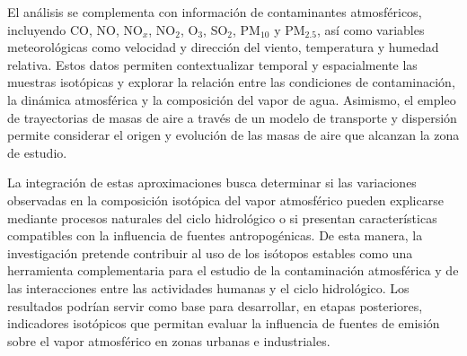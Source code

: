 \documentclass[12pt,a4paper]{article}
\begin{document}
El análisis se complementa con información de contaminantes atmosféricos, 
incluyendo CO, NO, NO$_x$, NO$_2$, O$_3$, SO$_2$, PM$_{10}$ y PM$_{2.5}$, 
así como variables meteorológicas como velocidad y dirección del viento, 
temperatura y humedad relativa. 
Estos datos permiten contextualizar temporal y espacialmente las muestras 
isotópicas y explorar la relación entre las condiciones de contaminación, la 
dinámica atmosférica y la composición del vapor de agua. Asimismo, el empleo de
trayectorias de masas de aire a través de un modelo de transporte
y dispersión permite considerar el origen y evolución de las
masas de aire que alcanzan la zona de estudio.

La integración de estas aproximaciones busca determinar si las variaciones 
observadas en la composición isotópica del vapor atmosférico pueden explicarse 
mediante procesos naturales del ciclo hidrológico o si presentan características
compatibles con la influencia de fuentes antropogénicas. De esta manera, la 
investigación pretende contribuir al uso de los isótopos estables como una 
herramienta complementaria para el estudio de la contaminación atmosférica y 
de las interacciones entre las actividades humanas y el ciclo hidrológico. Los 
resultados podrían servir como base para desarrollar, en etapas posteriores, 
indicadores isotópicos que permitan evaluar la influencia de fuentes de emisión
sobre el vapor atmosférico en zonas urbanas e industriales.
\end{document}
